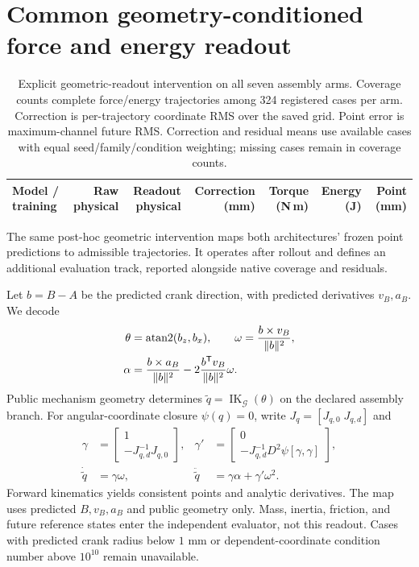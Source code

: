 \documentclass[10pt,twocolumn,letterpaper]{article}
\begin{document}
\section{Common geometry-conditioned force and energy readout}
\label{app:geometry-readout}

\begin{table}[!t]
\caption{Explicit geometric-readout intervention on all seven assembly arms. Coverage counts complete force/energy trajectories among 324 registered cases per arm. Correction is per-trajectory coordinate RMS over the saved grid. Point error is maximum-channel future RMS. Correction and residual means use available cases with equal seed/family/condition weighting; missing cases remain in coverage counts.}
\label{app:geometry-readout-table}
\centering\small
\begin{tabular}{lrrrrrr}
\toprule
Model / training & Raw physical & Readout physical & Correction (mm) & Torque (N\,m) & Energy (J) & Point (mm)\\
\midrule

\bottomrule
\end{tabular}
\end{table}
The same post-hoc geometric intervention maps both architectures' frozen point predictions to admissible trajectories. It operates after rollout and defines an additional evaluation track, reported alongside native coverage and residuals.

Let $b=B-A$ be the predicted crank direction, with predicted derivatives $v_B,a_B$. We decode
\begin{align}
\theta&=\operatorname{atan2}(b_z,b_x),\qquad
\omega=\frac{b\times v_B}{\|b\|^2},\\
\alpha&=\frac{b\times a_B}{\|b\|^2}
-2\frac{b^{\mathsf T} v_B}{\|b\|^2}\omega.
\end{align}
Public mechanism geometry determines $\widetilde q=\operatorname{IK}_{\mathcal G}(\theta)$ on the declared assembly branch. For angular-coordinate closure $\psi(q)=0$, write $J_q=[J_{q,0}\;J_{q,d}]$ and
\begin{align}
\gamma&=\begin{bmatrix}1\\-J_{q,d}^{-1}J_{q,0}\end{bmatrix},&
\gamma'&=\begin{bmatrix}0\\-J_{q,d}^{-1}D^2\psi[\gamma,\gamma]\end{bmatrix},\\
\dot{\widetilde q}&=\gamma\omega,&
\ddot{\widetilde q}&=\gamma\alpha+\gamma'\omega^2.
\end{align}
Forward kinematics yields consistent points and analytic derivatives. The map uses predicted $B,v_B,a_B$ and public geometry only. Mass, inertia, friction, and future reference states enter the independent evaluator, not this readout. Cases with predicted crank radius below $1$ mm or dependent-coordinate condition number above $10^{10}$ remain unavailable.
\end{document}
